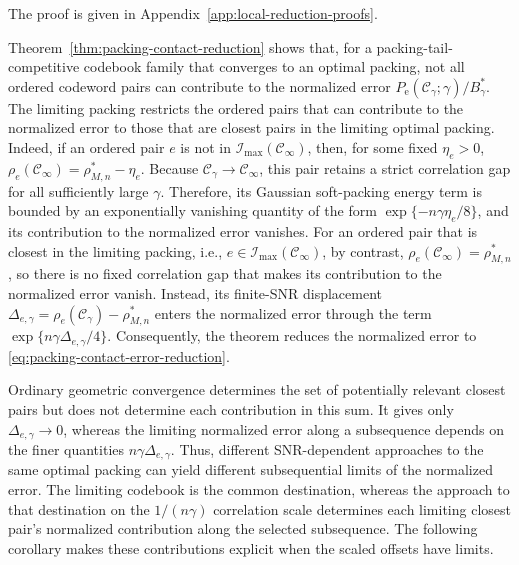 \documentclass[12pt,draftclsnofoot,onecolumn]{IEEEtran}
\newcommand{\cC}{\mathcal{C}}
\newcommand{\cI}{\mathcal{I}}
\newcommand{\Pe}{P_{\mathrm e}}
\theoremstyle{definition}
\begin{document}
\begin{IEEEproof}
The proof is given in
Appendix~\ref{app:local-reduction-proofs}.
\end{IEEEproof}


Theorem~\ref{thm:packing-contact-reduction} shows that, for a
packing-tail-competitive codebook family that converges to an optimal
packing, not all ordered codeword pairs can contribute to the normalized
error \(\Pe(\cC_\gamma;\gamma)/B_\gamma^{\ast}\).  The limiting packing
restricts the ordered pairs that can contribute to the normalized error to
those that are closest pairs in the limiting optimal packing.  Indeed, if an
ordered pair \(e\) is not in
\(\cI_{\max}(\cC_\infty)\),
then, for some fixed \(\eta_e>0\),
\(\rho_e(\cC_\infty)=\rho^{\ast}_{M,n}-\eta_e\).
Because \(\cC_\gamma\to\cC_\infty\), this pair retains a
strict correlation gap for all sufficiently large \(\gamma\).  Therefore,
its Gaussian soft-packing energy term is bounded by an exponentially vanishing quantity
of the form \(\exp\{-n\gamma\eta_e/8\}\), and its contribution to the normalized error vanishes.
For an ordered pair that is closest in the limiting packing, i.e., \(e \in
\cI_{\max}(\cC_\infty)\), by contrast,
\(\rho_e(\cC_\infty)=\rho^{\ast}_{M,n}\),
so there is no fixed correlation gap that makes its contribution to the
normalized error vanish.  Instead, its finite-SNR displacement
\(\Delta_{e,\gamma}=
\rho_e(\cC_\gamma)-\rho^{\ast}_{M,n}\)
enters the normalized error through the term
\(\exp\{n\gamma\Delta_{e,\gamma}/4\}\).
Consequently, the theorem reduces the normalized error to
\eqref{eq:packing-contact-error-reduction}.

Ordinary geometric convergence determines the set of potentially relevant
closest pairs but does not determine each contribution in this sum.  It
gives only \(\Delta_{e,\gamma}\to0\), whereas the limiting normalized error
along a subsequence depends on the finer quantities
\(n\gamma\Delta_{e,\gamma}\).  Thus, different SNR-dependent approaches to
the same optimal packing can yield different subsequential limits of the
normalized error.  The limiting codebook is the common destination,
whereas the approach to that destination on the \(1/(n\gamma)\) correlation
scale determines each limiting closest pair's normalized contribution along
the selected subsequence.  The following corollary makes these contributions
explicit when the scaled offsets have limits.
\end{document}
